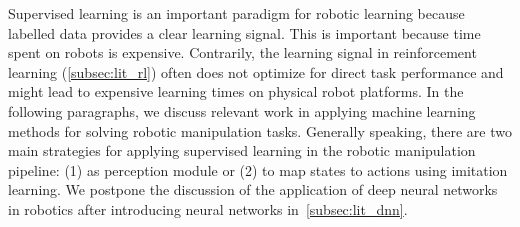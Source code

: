 \documentclass[\home/main.tex]{subfiles}
\begin{document}
Supervised learning is an important paradigm for robotic learning because labelled data provides a clear learning signal. This is important because time spent on robots is expensive. Contrarily, the learning signal in reinforcement learning (\cref{subsec:lit_rl}) often does not optimize for direct task performance and might lead to expensive learning times on physical robot platforms. In the following paragraphs, we discuss relevant work in applying machine learning methods for solving robotic manipulation tasks. Generally speaking, there are two main strategies for applying supervised learning in the robotic manipulation pipeline: (1) as perception module or (2) to map states to actions using imitation learning. We postpone the discussion of the application of deep neural networks in robotics after introducing neural networks in~\cref{subsec:lit_dnn}.
\end{document}
